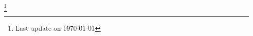 \documentclass[10pt]{article}
\makeatletter
\newenvironment{unindentsection}[1]%
{\begin{list}{}%
	{\setlength{\leftmargin}{-0.5#1}}%
	\item[]%
}
{\end{list}}
\newcommand{\headerrow}[2]
{\begin{tabular*}{\linewidth}{l@{\extracolsep{\fill}}r}
	#1 &
	#2 \\
\end{tabular*}}
\makeatother
\begin{document}
\let\thefootnote\relax\footnote{Last update on \today}



%
\end{document}
